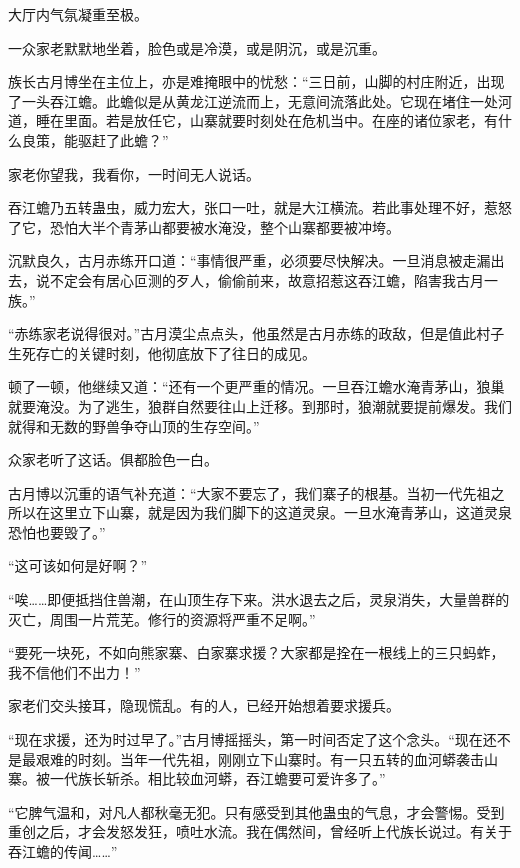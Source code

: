 
\begin{this_body}

大厅内气氛凝重至极。

一众家老默默地坐着，脸色或是冷漠，或是阴沉，或是沉重。

族长古月博坐在主位上，亦是难掩眼中的忧愁：“三日前，山脚的村庄附近，出现了一头吞江蟾。此蟾似是从黄龙江逆流而上，无意间流落此处。它现在堵住一处河道，睡在里面。若是放任它，山寨就要时刻处在危机当中。在座的诸位家老，有什么良策，能驱赶了此蟾？”

家老你望我，我看你，一时间无人说话。

吞江蟾乃五转蛊虫，威力宏大，张口一吐，就是大江横流。若此事处理不好，惹怒了它，恐怕大半个青茅山都要被水淹没，整个山寨都要被冲垮。

沉默良久，古月赤练开口道：“事情很严重，必须要尽快解决。一旦消息被走漏出去，说不定会有居心叵测的歹人，偷偷前来，故意招惹这吞江蟾，陷害我古月一族。”

“赤练家老说得很对。”古月漠尘点点头，他虽然是古月赤练的政敌，但是值此村子生死存亡的关键时刻，他彻底放下了往日的成见。

顿了一顿，他继续又道：“还有一个更严重的情况。一旦吞江蟾水淹青茅山，狼巢就要淹没。为了逃生，狼群自然要往山上迁移。到那时，狼潮就要提前爆发。我们就得和无数的野兽争夺山顶的生存空间。”

众家老听了这话。俱都脸色一白。

古月博以沉重的语气补充道：“大家不要忘了，我们寨子的根基。当初一代先祖之所以在这里立下山寨，就是因为我们脚下的这道灵泉。一旦水淹青茅山，这道灵泉恐怕也要毁了。”

“这可该如何是好啊？”

“唉……即便抵挡住兽潮，在山顶生存下来。洪水退去之后，灵泉消失，大量兽群的灭亡，周围一片荒芜。修行的资源将严重不足啊。”

“要死一块死，不如向熊家寨、白家寨求援？大家都是拴在一根线上的三只蚂蚱，我不信他们不出力！”

家老们交头接耳，隐现慌乱。有的人，已经开始想着要求援兵。

“现在求援，还为时过早了。”古月博摇摇头，第一时间否定了这个念头。“现在还不是最艰难的时刻。当年一代先祖，刚刚立下山寨时。有一只五转的血河蟒袭击山寨。被一代族长斩杀。相比较血河蟒，吞江蟾要可爱许多了。”

“它脾气温和，对凡人都秋毫无犯。只有感受到其他蛊虫的气息，才会警惕。受到重创之后，才会发怒发狂，喷吐水流。我在偶然间，曾经听上代族长说过。有关于吞江蟾的传闻……”


\end{this_body}

